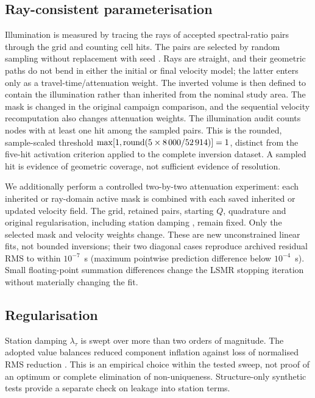 \documentclass[review,authoryear,longtitle]{elsarticle}
\begin{document}
\subsection{Ray-consistent parameterisation}

Illumination is measured by tracing the rays of \paresTrazados{}
accepted spectral-ratio pairs through the grid and counting cell hits.
The pairs are selected by random sampling without replacement with seed
\semillaRayos. Rays are straight, and their geometric paths do not bend
in either the initial or final velocity model; the latter enters only
as a travel-time/attenuation weight. The inverted
volume is then defined to contain the illumination rather than inherited
from the nominal study area. The mask is changed in
the original campaign comparison, and the sequential velocity recomputation
also changes attenuation weights. The illumination audit counts nodes
with at least one hit among the sampled pairs. This is the rounded,
sample-scaled threshold $\max[1,\operatorname{round}(5\times
8\,000/52\,914)]=1$, distinct from the five-hit activation
criterion applied to the complete inversion dataset. A sampled hit is
evidence of geometric coverage, not sufficient evidence of resolution.

We additionally perform a controlled two-by-two attenuation experiment:
each inherited or ray-domain active mask is combined with each saved
inherited or updated velocity field. The grid, retained pairs, starting
$Q$, quadrature and original regularisation, including station damping
\qStationDampPrevio, remain fixed. Only the selected mask and velocity
weights change. These are new unconstrained linear fits, not bounded
inversions; their two diagonal cases reproduce archived residual RMS to
within $10^{-7}$~s (maximum pointwise prediction difference below
$10^{-4}$~s). Small floating-point summation differences change the LSMR
stopping iteration without materially changing the fit.

\subsection{Regularisation}

Station damping $\lambda_\tau$ is swept over more than two orders of
magnitude. The adopted value balances reduced component inflation against
loss of normalised RMS reduction \citep{Hansen1992,Menke2018}. This is
an empirical choice within the tested sweep, not proof of an optimum or
complete elimination of non-uniqueness. Structure-only synthetic tests
provide a separate check on leakage into station terms.
\end{document}
